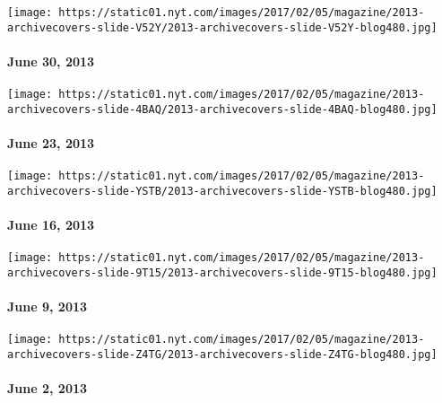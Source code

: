 \texttt{[image: https://static01.nyt.com/images/2017/02/05/magazine/2013-archivecovers-slide-V52Y/2013-archivecovers-slide-V52Y-blog480.jpg]}

\hypertarget{june-30-2013}{%
\paragraph{June 30, 2013}\label{june-30-2013}}

\href{http://www.nytimes.com/indexes/2013/06/23/magazine/index.html}{}

\texttt{[image: https://static01.nyt.com/images/2017/02/05/magazine/2013-archivecovers-slide-4BAQ/2013-archivecovers-slide-4BAQ-blog480.jpg]}

\hypertarget{june-23-2013}{%
\paragraph{June 23, 2013}\label{june-23-2013}}

\href{http://www.nytimes.com/indexes/2013/06/16/magazine/index.html}{}

\texttt{[image: https://static01.nyt.com/images/2017/02/05/magazine/2013-archivecovers-slide-YSTB/2013-archivecovers-slide-YSTB-blog480.jpg]}

\hypertarget{june-16-2013}{%
\paragraph{June 16, 2013}\label{june-16-2013}}

\href{http://www.nytimes.com/indexes/2013/06/09/magazine/index.html}{}

\texttt{[image: https://static01.nyt.com/images/2017/02/05/magazine/2013-archivecovers-slide-9T15/2013-archivecovers-slide-9T15-blog480.jpg]}

\hypertarget{june-9-2013}{%
\paragraph{June 9, 2013}\label{june-9-2013}}

\href{http://www.nytimes.com/indexes/2013/06/02/magazine/index.html}{}

\texttt{[image: https://static01.nyt.com/images/2017/02/05/magazine/2013-archivecovers-slide-Z4TG/2013-archivecovers-slide-Z4TG-blog480.jpg]}

\hypertarget{june-2-2013}{%
\paragraph{June 2, 2013}\label{june-2-2013}}

